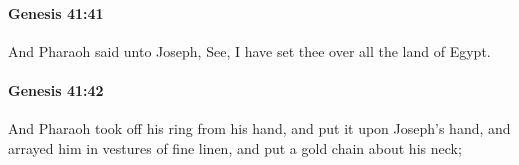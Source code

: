 		\paragraph{Genesis 41:41} %
			\label{GENESIS-41-41}

			And Pharaoh said unto Joseph, See, I have set thee over all the land of Egypt.


		\paragraph{Genesis 41:42} %
			\label{GENESIS-41-42}

			And Pharaoh took off his ring from his hand, and put it upon Joseph's hand, and arrayed him in vestures of fine linen, and put a gold chain about his neck;


